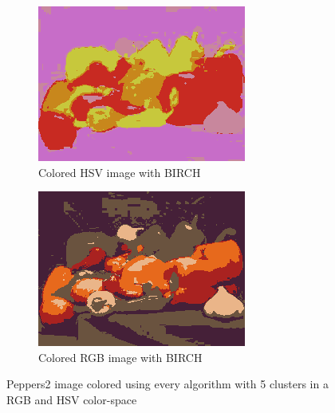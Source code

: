 \documentclass[sigconf,authorversion]{acmart}
\begin{document}
\begin{figure}[hbtp]
  \begin{subfigure}[b]{0.45\columnwidth}
      \includegraphics[width=\columnwidth]{../outputs/peppers2_5_hsv_colored_birch.png}
      \caption{Colored HSV image with BIRCH}
      \label{subfig:peppers_hsv_birch}
  \end{subfigure}
  \hspace{0.05\columnwidth}
  \begin{subfigure}[b]{0.45\columnwidth}
      \includegraphics[width=\columnwidth]{../outputs/peppers2_5_rgb_colored_birch.png}
      \caption{Colored RGB image with BIRCH}
      \label{subfig:peppers_rgb_birch}
  \end{subfigure}
  \caption{Peppers2 image colored  using every algorithm with 5 clusters in a RGB and HSV color-space}
  \label{fig:peppers_5}
\end{figure}
\end{document}
